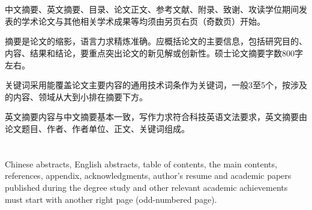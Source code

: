 \intobmk*{\cleardoublepage}{\coverNameMark~\titleMark}
\makeTitle

\makeDeclaration

\intobmk*{\cleardoublepage}{\abstractNameMark}
\chapter*{\abstractName}

中文摘要、英文摘要、目录、论文正文、参考文献、附录、致谢、攻读学位期间发表的学术论文与其他相关学术成果等均须由另页右页（奇数页）开始。

摘要是论文的缩影，语言力求精炼准确。应概括论文的主要信息，包括研究目的、内容、结果和结论，要重点突出论文的新见解或创新性。硕士论文摘要字数800字左右。

关键词采用能覆盖论文主要内容的通用技术词条作为关键词，一般3至5个，按涉及的内容、领域从大到小排在摘要下方。

英文摘要内容与中文摘要基本一致，写作力求符合科技英语文法要求，英文摘要由论文题目、作者、作者单位、正文、关键词组成。



\intobmk*{\cleardoublepage}{\enAbstractNameMark}
\chapter*{\enTitleValue}

{
    \vspace{\baselineskip}
    \noindent\bfseries{\enAbstractName}
}

Chinese abstracts, English abstracts, table of contents, the main contents, references, appendix, acknowledgments, author's resume and academic papers published during the degree study and other relevant academic achievements must start with another right page (odd-numbered page).

